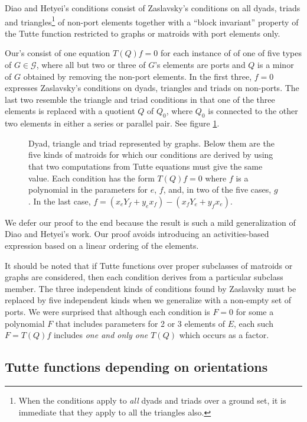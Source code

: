 \documentclass[12pt,leqno]{amsart}
\theoremstyle{remark}
\begin{document}
Diao and Hetyei's conditions consist
of Zaslavsky's 
conditions on all dyads, triads and 
triangles\footnote{When the conditions apply to \textit{all} dyads 
and triads over a ground set, it is immediate that they apply to all
the triangles also.}
of non-port elements
together with a ``block invariant'' property of
the Tutte function restricted to graphs or matroids with
port elements only.

Our's consist of 
one equation $T(Q)f=0$ for each instance of 
of one of five types of $G\in\mathcal{G}$, where
all but two or three of $G$'s elements
are ports
and $Q$ is a minor of $G$ obtained by removing 
the non-port elements.  In the first three,
$f=0$ expresses Zaslavsky's conditions on dyads,
triangles and triads on non-ports.  The last two resemble the
triangle and triad conditions in that one of the 
three elements is replaced with a quotient $Q$ of 
$Q_0$, where $Q_0$ is connected to the other two elements
in either a series or parallel pair.  See figure \ref{small}.

\begin{figure}

\caption{\label{small} Dyad, triangle and triad 
\cite{MR93a:05047} represented by graphs.
Below them are the five kinds of matroids for which our conditions
are derived by using that two computations from Tutte equations
must give the same value.  Each condition has the
form $T(Q)f=0$ where $f$ is a polynomial in the parameters
for $e$, $f$, and, in two of the five cases, $g$.
In the last case, $f=(x_eY_f+y_ex_f)-(x_fY_e+y_fx_e)$.}
\end{figure}

We defer our proof to the end because the 
result is such a mild generalization of 
Diao and Hetyei's work.  Our proof avoids 
introducing an activities-based expression
based on a linear ordering of the elements.

It should be noted that if Tutte functions
over proper subclasses of matroids or graphs are considered,
then each condition derives from a particular subclass
member.  The three independent kinds of conditions found by
Zaslavsky must be replaced by five independent kinds when we
generalize with a non-empty set of ports. 
We were surprised that although each condition
is $F=0$ for some a polynomial $F$ that includes 
parameters for 2 or 3 elements of $E$,
each such $F=T(Q)f$ includes 
\emph{one and only one $T(Q)$} which occurs as 
a factor.

\subsection{Tutte functions depending on orientations}
\end{document}
